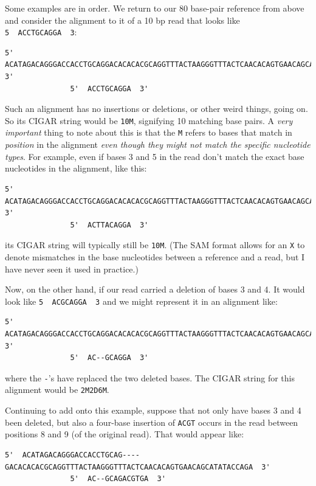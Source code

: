 \documentclass[]{krantz}
\begin{document}
Some examples are in order. We return to our 80 base-pair reference from above and consider
the alignment to it of a 10 bp read that looks like \texttt{5\textquotesingle{}\ \ ACCTGCAGGA\ \ 3\textquotesingle{}}:

\begin{verbatim}
5'  ACATAGACAGGGACCACCTGCAGGACACACACGCAGGTTTACTAAGGGTTTACTCAACACAGTGAACAGCATATACCAGA  3'
               5'  ACCTGCAGGA  3'
\end{verbatim}

Such an alignment has no insertions or deletions, or other weird things, going on. So its
CIGAR string would be \texttt{10M}, signifying 10 matching base pairs. A \emph{very important} thing
to note about this is that the \texttt{M} refers to bases that match in \emph{position} in the alignment
\emph{even though they might not match the specific nucleotide types}. For example, even if
bases 3 and 5 in the read don't match the exact base nucleotides in the alignment, like this:

\begin{verbatim}
5'  ACATAGACAGGGACCACCTGCAGGACACACACGCAGGTTTACTAAGGGTTTACTCAACACAGTGAACAGCATATACCAGA  3'
               5'  ACTTACAGGA  3'
\end{verbatim}

its CIGAR string will typically still be \texttt{10M}. (The SAM format allows for an \texttt{X} to denote
mismatches in the base nucleotides between a reference and a read, but I have never seen
it used in practice.)

Now, on the other hand, if our read carried a deletion of bases 3 and 4. It would look
like \texttt{5\textquotesingle{}\ \ ACGCAGGA\ \ 3\textquotesingle{}} and we might represent it in an alignment like:

\begin{verbatim}
5'  ACATAGACAGGGACCACCTGCAGGACACACACGCAGGTTTACTAAGGGTTTACTCAACACAGTGAACAGCATATACCAGA  3'
               5'  AC--GCAGGA  3'
\end{verbatim}

where the \texttt{-}'s have replaced the two deleted bases. The CIGAR string for this
alignment would be \texttt{2M2D6M}.

Continuing to add onto this example, suppose that not only have bases 3 and 4 been deleted,
but also a four-base insertion of \texttt{ACGT} occurs in the read between positions 8 and 9 (of the original
read). That would appear like:

\begin{verbatim}
5'  ACATAGACAGGGACCACCTGCAG----GACACACACGCAGGTTTACTAAGGGTTTACTCAACACAGTGAACAGCATATACCAGA  3'
               5'  AC--GCAGACGTGA  3'
\end{verbatim}
\end{document}
